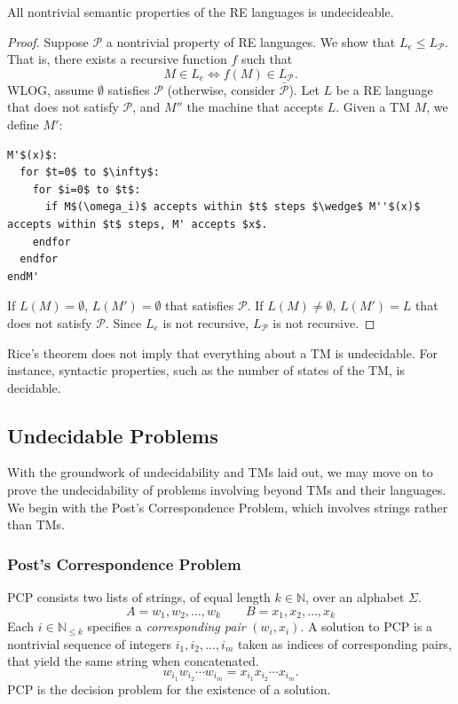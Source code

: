 \begin{theorem}
  All nontrivial semantic properties of the RE languages is undecideable.
\end{theorem}
\begin{proof}
  Suppose $\mathcal{P}$ a nontrivial property of RE languages. We show that
  $L_e\le L_\mathcal{P}$. That is, there exists a recursive function $f$ such
  that
  \[M\in L_e\iff f(M)\in L_\mathcal{P}.\]
  WLOG, assume $\emptyset $ satisfies $\mathcal{P}$ (otherwise, consider
  $\bar{\mathcal{P}}$). Let $L$ be a RE language that does not satisfy
  $\mathcal{P}$, and $M''$ the machine that accepts $L$. Given a TM $M$,
  we define $M'$:
  \begin{lstlisting}[mathescape]
M'$(x)$:
  for $t=0$ to $\infty$:
    for $i=0$ to $t$:
      if M$(\omega_i)$ accepts within $t$ steps $\wedge$ M''$(x)$ accepts within $t$ steps, M' accepts $x$. 
    endfor
  endfor
endM'
  \end{lstlisting}
  If $L(M)=\emptyset $, $L(M')=\emptyset $ that satisfies $\mathcal{P}$. If
  $L(M)\neq\emptyset $, $L(M')=L$ that does not satisfy $\mathcal{P}$. Since
  $L_e$ is not recursive, $L_\mathcal{P}$ is not recursive.
\end{proof}

\begin{remark}
  Rice's theorem does not imply that everything about a TM is undecidable. For
  instance, syntactic properties, such as the number of states of the TM, is
  decidable.
\end{remark}

\subsection{Undecidable Problems}
With the groundwork of undecidability and TMs laid out, we may move on to prove
the undecidability of problems involving beyond TMs and their languages. We
begin with the Post's Correspondence Problem, which involves strings rather
than TMs.

\subsubsection{Post's Correspondence Problem}
PCP consists two lists of strings, of equal length $k\in \mathbb{N}$, over an
alphabet $\Sigma$.
\[A=w_1,w_2,\ldots,w_k \qquad B=x_1,x_2,\ldots,x_k\]
Each $i\in \mathbb{N}_{\le k}$ specifies a \textit{corresponding pair} $\left(
w_i,x_i \right) $. A solution to PCP is a nontrivial sequence of integers
$i_1,i_2,\ldots,i_m$ taken as indices of corresponding pairs, that yield the
same string when concatenated.
\[w_{i_1}w_{i_2}\cdots w_{i_m}=x_{i_1}x_{i_2}\cdots x_{i_m}.\]
PCP is the decision problem for the existence of a solution.

